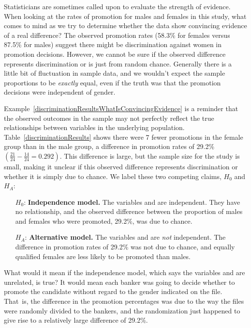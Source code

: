 \begin{example}{Statisticians are sometimes called upon to evaluate the strength of evidence. When looking at the rates of promotion for males and females in this study, what comes to mind as we try to determine whether the data show convincing evidence of a real difference?} \label{discriminationResultsWhatIsConvincingEvidence}
The observed promotion rates (58.3\% for females versus 87.5\% for males) suggest there might be discrimination against women in promotion decisions. However, we cannot be sure if the observed difference represents discrimination or is just from random chance. Generally there is a little bit of fluctuation in sample data, and we wouldn't expect the sample proportions to be \emph{exactly} equal, even if the truth was that the promotion decisions were independent of gender.
\end{example}

Example~\ref{discriminationResultsWhatIsConvincingEvidence} is a reminder that the observed outcomes in the sample may not perfectly reflect the true relationships between variables in the underlying population. Table~\ref{discriminationResults} shows there were 7 fewer promotions in the female group than in the male group, a difference in promotion rates of 29.2\% $\left( \frac{21}{24} - \frac{14}{24} = 0.292 \right)$. This difference is large, but the sample size for the study is small, making it unclear if this observed difference represents discrimination or whether it is simply due to chance. We label these two competing claims, $H_0$ and $H_A$:
\begin{itemize}
\setlength{\itemsep}{0mm}
\item[$H_0$:] \textbf{Independence model.} The variables  and  are independent. They have no relationship, and the observed difference between the proportion of males and females who were promoted, 29.2\%, was due to chance.
\item[$H_A$:] \textbf{Alternative model.} The variables  and  are \emph{not} independent. The difference in promotion rates of 29.2\% was not due to chance, and equally qualified females are less likely to be promoted than males.
\end{itemize}

What would it mean if the independence model, which says the variables  and  are unrelated, is true? It would mean each banker was going to decide whether to promote the candidate without regard to the gender indicated on the file. That~is, the difference in the promotion percentages was due to the way the files were randomly divided to the bankers, and the randomization just happened to give rise to a relatively large difference of 29.2\%.

